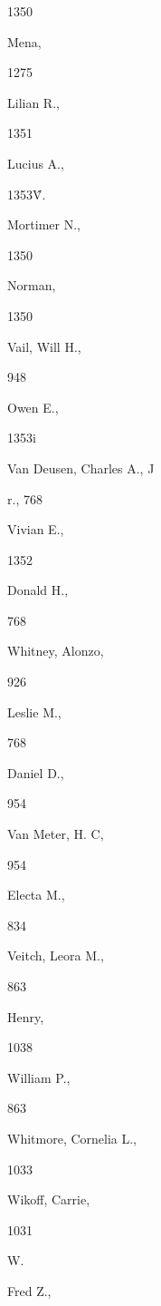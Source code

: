 {{{{{1350 


Mena, 


1275 


Lilian R., 


1351 






Lucius A., 


1353\^ 


V. 




Mortimer N., 


1350 






Norman, 


1350 


Vail, Will H., 


948 


Owen E., 


1353i 


Van Deusen, Charles A., J 


r., 768 


Vivian E., 


1352 


Donald H., 


768 


Whitney, Alonzo, 


926 


Leslie M., 


768 


Daniel D., 


954 


Van Meter, H. C, 


954 


Electa M., 


834 


Veitch, Leora M., 


863 


Henry, 


1038 


William P., 


863 


Whitmore, Cornelia L., 


1033 






Wikoff, Carrie, 


1031 


W. 




Fred Z., 


}}}}}
